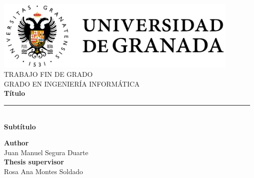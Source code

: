 \begin{titlepage}

  \newlength{\centeroffset}
  \setlength{\centeroffset}{-0.5\oddsidemargin}
  \addtolength{\centeroffset}{0.5\evensidemargin}
  \thispagestyle{empty}

  \noindent\hspace*{\centeroffset}
  \begin{minipage}{\textwidth}
    \centering

    \includegraphics[width=0.9\textwidth]{images/ugr-full.png} \\[1em]

    \textsc{\Large TRABAJO FIN DE GRADO} \\[0.2cm]
    \textsc{GRADO EN INGENIERÍA INFORMÁTICA} \\[1cm]

    {\Huge\bfseries Título} \\

    \noindent\rule[-1ex]{\textwidth}{2pt} \\[3.5ex]

    {\large\bfseries Subtítulo}
  \end{minipage}

  \vspace{2.5cm}
  \noindent\hspace*{\centeroffset}

  \begin{minipage}{\textwidth}
    \centering

    \textbf{Author} \\[0.1em]
    \textnormal{Juan Manuel Segura Duarte} \\[2.5ex]

    \textbf{Thesis supervisor} \\[0.1em]
    \textnormal{Rosa Ana Montes Soldado} \\[2cm]


\end{minipage}
\end{titlepage}
